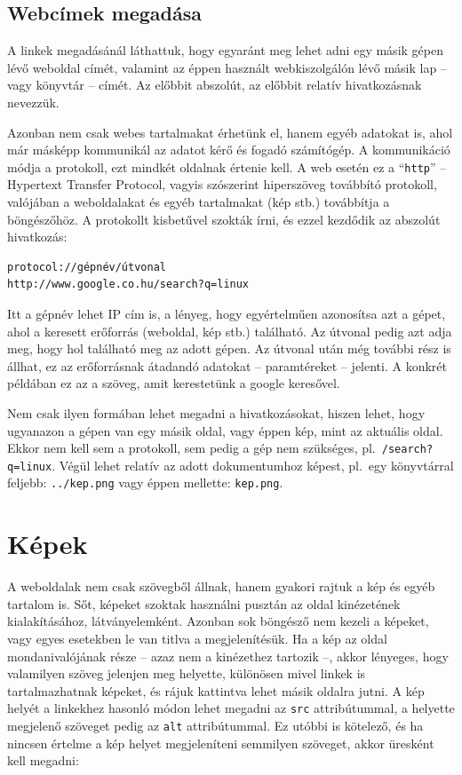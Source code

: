 \subsection{Webcímek megadása}

A linkek megadásánál láthattuk, hogy egyaránt meg lehet adni egy másik gépen
lévő weboldal címét, valamint az éppen használt webkiszolgálón lévő másik lap --
vagy könyvtár -- címét. Az előbbit abszolút, az előbbit relatív hivatkozásnak
nevezzük.

Azonban nem csak webes tartalmakat érhetünk el, hanem egyéb adatokat is, ahol
már másképp kommunikál az adatot kérő és fogadó számítógép. A kommunikáció módja
a protokoll, ezt mindkét oldalnak értenie kell. A web esetén ez a
``\texttt{http}'' --
Hypertext Transfer Protocol, vagyis szószerint hiperszöveg továbbító protokoll,
valójában a weboldalakat és egyéb tartalmakat (kép stb.) továbbítja a
böngészőhöz. A protokollt kisbetűvel szokták írni, és ezzel kezdődik az abszolút
hivatkozás:

\begin{Verbatim}[frame=single]
protocol://gépnév/útvonal
http://www.google.co.hu/search?q=linux
\end{Verbatim}

Itt a gépnév lehet IP cím is, a lényeg, hogy egyértelműen azonosítsa azt a
gépet, ahol a keresett erőforrás (weboldal, kép stb.) található. Az útvonal
pedig azt adja meg, hogy hol található meg az adott gépen. Az útvonal után még
további rész is állhat, ez az erőforrásnak átadandó adatokat -- paramtéreket --
jelenti. A konkrét példában ez az a szöveg, amit kerestetünk a google keresővel.

Nem csak ilyen formában lehet megadni a hivatkozásokat, hiszen lehet, hogy
ugyanazon a gépen van egy másik oldal, vagy éppen kép, mint az aktuális
oldal. Ekkor nem kell sem a protokoll, sem pedig a gép nem szükséges, pl.\
\texttt{/search?q=linux}.  Végül lehet relatív az adott dokumentumhoz képest,
pl.\ egy könyvtárral feljebb: \texttt{../kep.png} vagy éppen mellette:
\texttt{kep.png}.


\section{Képek}
A weboldalak nem csak szövegből állnak, hanem gyakori rajtuk a kép és egyéb
tartalom is. Sőt, képeket szoktak használni pusztán az oldal kinézetének
kialakításához, látványelemként. Azonban sok böngésző nem kezeli a képeket, vagy
egyes esetekben le van titlva a megjelenítésük. Ha a kép az oldal
mondanivalójának része -- azaz nem a kinézethez tartozik --, akkor lényeges,
hogy valamilyen szöveg jelenjen meg helyette, különösen mivel linkek is
tartalmazhatnak képeket, és rájuk kattintva lehet másik oldalra jutni.  A kép
helyét a linkekhez hasonló módon lehet megadni az \texttt{src} attribútummal, a
helyette megjelenő szöveget pedig az \texttt{alt} attribútummal. Ez utóbbi is
kötelező, és ha nincsen értelme a kép helyet megjeleníteni semmilyen szöveget,
akkor üresként kell megadni:

